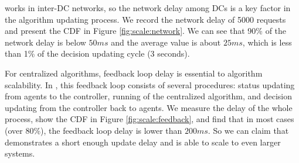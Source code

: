  \name works in inter-DC networks, so the network delay among DCs is a key factor in the algorithm updating process. We record the network delay of 5000 requests and present the CDF in Figure \ref{fig:scale:network}. We can see that 90\% of the network delay is below $50ms$ and the average value is about $25ms$, which is less than 1\% of the decision updating cycle (3 seconds).

 For centralized algorithms, feedback loop delay is essential to algorithm scalability. In \name, this feedback loop consists of several procedures: status updating from agents to the controller, running of the centralized algorithm, and decision updating from the controller back to agents. We measure the delay of the whole process, show the CDF in Figure \ref{fig:scale:feedback}, and find that in most cases (over 80\%), the feedback loop delay is lower than $200ms$. So we can claim that \name demonstrates a short enough update delay and is able to scale to even larger systems.

